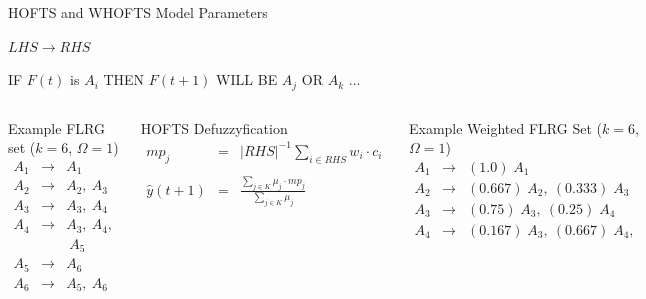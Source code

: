 \documentclass{beamer}
\begin{document}

\begin{frame}{HOFTS and WHOFTS Model Parameters}
\scriptsize
\begin{center}
$LHS \rightarrow RHS$

IF $F(t)$ is $A_i$ THEN $F(t+1)$ WILL BE $A_j$ OR $A_k$ ...    
\end{center}

\begin{columns}
\begin{block}{Example FLRG set ($k=6$, $\Omega=1$)}
$$
\begin{array}{rcl}
A_1  & \rightarrow &  A_1 \\
A_2  & \rightarrow &  A_2,\  A_3 \\
A_3  & \rightarrow &  A_3,\  A_4 \\
A_4  & \rightarrow &  A_3,\  A_4,\\
& & \  A_5 \\
A_5  & \rightarrow &  A_6 \\
A_6  & \rightarrow &  A_5,\  A_6 \\
\end{array}
$$
\end{block}
\begin{block}{HOFTS Defuzzyfication}
$$
\begin{array}{rcl}
    mp_j & = & \displaystyle |RHS|^{-1}\sum_{i \in RHS} w_i \cdot c_i  \\
     \\
     \hat{y}(t+1) & = & \displaystyle \frac{\sum_{j \in K} \mu_j\cdot mp_j}{\sum_{j \in K} \mu_j}
\end{array}
$$
\end{block}
\begin{block}{Example Weighted FLRG Set ($k=6$, $\Omega=1$)}
$$
\begin{array}{rcl}
A_1  & \rightarrow &  (1.0)\; A_1 \\
A_2  & \rightarrow &  (0.667)\; A_2,\  (0.333)\; A_3 \\
A_3  & \rightarrow &  (0.75)\; A_3,\  (0.25)\; A_4 \\
A_4  & \rightarrow &  (0.167)\; A_3,\  (0.667)\; A_4,\\

\end{array}$$
\end{block}
\end{columns}
\end{frame}
\end{document}
